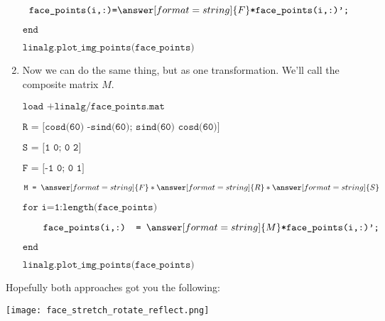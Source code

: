 \documentclass{ximera}
\begin{document}
\begin{exploration}
\begin{example}
\begin{enumerate}
            $\texttt{        face\_points(i,:)=}\answer[format=string]{F}\texttt{*face\_points(i,:)';}$

            $\texttt{end}$

            $\texttt{linalg.plot\_img\_points(face\_points)}$

            \item Now we can do the same thing, but as one transformation. We'll call the composite matrix $M$.
            
            \vspace{1cm}
            
            $\texttt{load +linalg/face\_points.mat}$

            $\texttt{R = [cosd(60) -sind(60); sind(60) cosd(60)]}$

            $\texttt{S = [1 0; 0 2]}$

            $\texttt{F = [-1 0; 0 1]}$

            $\texttt{M = }\answer[format=string]{F}*\answer[format=string]{R}*\answer[format=string]{S}$

            $\texttt{for i=1:length(face\_points)}$

            $\qquad \texttt{face\_points(i,:) = }\answer[format=string]{M}\texttt{*face\_points(i,:)';}$

            $\texttt{end}$

            $\texttt{linalg.plot\_img\_points(face\_points)}$

        \end{enumerate}

        Hopefully both approaches got you the following:

        \begin{center}
            \texttt{[image: face\_stretch\_rotate\_reflect.png]}
        \end{center}

    \end{example}

\end{exploration}
\end{document}
